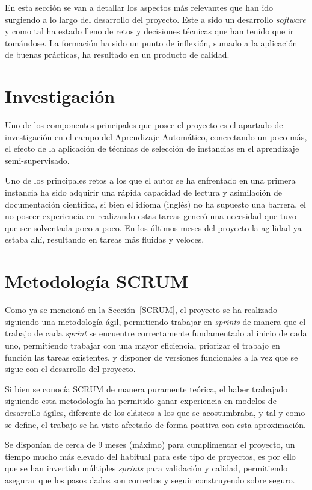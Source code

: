 
En esta sección se van a detallar los aspectos más relevantes que han ido surgiendo a lo largo del desarrollo del proyecto. Este a sido un desarrollo \textit{software} y como tal ha estado lleno de retos y decisiones técnicas que han tenido que ir tomándose. La formación ha sido un punto de inflexión, sumado a la aplicación de buenas prácticas, ha resultado en un producto de calidad.


\section{Investigación}
Uno de los componentes principales que posee el proyecto es el apartado de investigación en el campo del Aprendizaje Automático, concretando un poco más, el efecto de la aplicación de técnicas de selección de instancias en el aprendizaje semi-supervisado.

Uno de los principales retos a los que el autor se ha enfrentado en una primera instancia ha sido adquirir una rápida capacidad de lectura y asimilación de documentación científica, si bien el idioma (inglés) no ha supuesto una barrera, el no poseer experiencia en realizando estas tareas  generó una necesidad que tuvo que ser solventada poco a poco. En los últimos meses del proyecto la agilidad ya estaba ahí, resultando en tareas más fluidas y veloces.

\section{Metodología SCRUM}
Como ya se mencionó en la Sección~\ref{SCRUM}, el proyecto se ha realizado siguiendo una metodología ágil, permitiendo trabajar en \textit{sprints} de manera que el trabajo de cada \textit{sprint} se encuentre correctamente fundamentado al inicio de cada uno, permitiendo trabajar con una mayor eficiencia, priorizar el trabajo en función las tareas existentes, y disponer de versiones funcionales a la vez que se sigue con el desarrollo del proyecto.

Si bien se conocía SCRUM de manera puramente teórica, el haber trabajado siguiendo esta metodología ha permitido ganar experiencia en modelos de desarrollo ágiles, diferente de los clásicos a los que se acostumbraba, y tal y como se define, el trabajo se ha visto afectado de forma positiva con esta aproximación.

Se disponían de cerca de 9 meses (máximo) para cumplimentar el proyecto, un tiempo mucho más elevado del habitual para este tipo de proyectos, es por ello que se han invertido múltiples \textit{sprints} para validación y calidad, permitiendo asegurar que los pasos dados son correctos y seguir construyendo sobre seguro.

